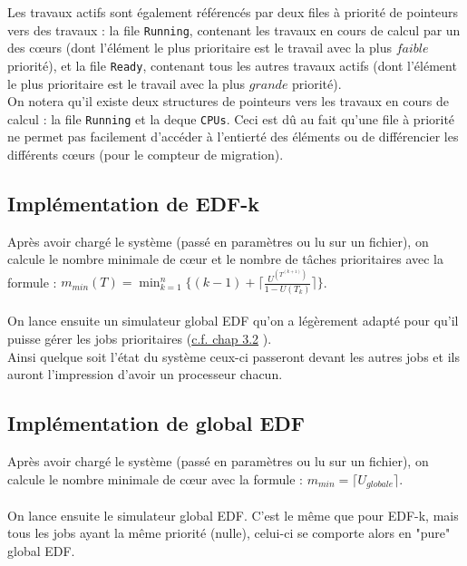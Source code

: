 \documentclass[a4paper,10pt]{article}
\begin{document}
		Les travaux actifs sont également référencés par deux files à priorité de pointeurs vers des travaux : la file \verb?Running?, contenant les 				travaux en cours de calcul par un des cœurs (dont l'élément le plus prioritaire est le travail avec la plus $faible$ priorité), et la file 					\verb?Ready?, contenant tous les autres travaux actifs (dont l'élément le plus prioritaire est le travail avec la plus $grande$ priorité).\\

		On notera qu'il existe deux structures de pointeurs vers les travaux en cours de calcul : la file \verb?Running? et la deque \verb?CPUs?. Ceci est 			dû au fait qu'une file à priorité ne permet pas facilement d'accéder à l'entierté des éléments ou de différencier les différents cœurs (pour le 			compteur de migration).
		
		
	\subsection{Implémentation de EDF-k}
		Après avoir chargé le système (passé en paramètres ou lu sur un fichier), on calcule le nombre minimale de cœur et le nombre de tâches 					prioritaires avec la formule : $ m_{min}(T) = \min_{k=1}^n \{  (k-1) + \lceil \frac{U^{(T^{(k+1)})}}{1- U(T_k)}  \rceil \} $.\\
		~\\
		On lance ensuite un simulateur global EDF qu'on a légèrement adapté pour qu'il puisse gérer les jobs prioritaires (\hyperlink{prioriteEDFk}{c.f. chap 3.2} ).\\
		Ainsi quelque soit l'état du système ceux-ci passeront devant les autres jobs et ils auront l'impression d'avoir un processeur chacun.
		
		
	\subsection{Implémentation de global EDF}
		Après avoir chargé le système (passé en paramètres ou lu sur un fichier), on calcule le nombre minimale de cœur avec la formule : $ m_{min} =\lceil 		U_{globale} \rceil$.\\
		~\\
		On lance ensuite le simulateur global EDF. C'est le même que pour EDF-k, mais tous les jobs ayant la même priorité (nulle), celui-ci se comporte alors en "pure" global EDF.
\end{document}

